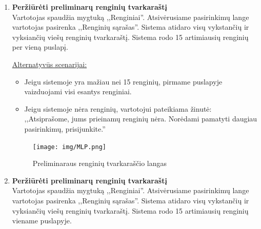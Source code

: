 \documentclass{VUMIFPSkursinis}
\begin{document}
\begin{enumerate} [label = \textbf{U\arabic*.}]
					\underline{Alternatyvūs scenarijai:}
					\begin{itemize}
						\item Jeigu sistemoje yra mažiau nei 15 renginių, pirmame puslapyje vaizduojami visi esantys renginiai. 
						\item Jeigu sistemoje nėra renginių, vartotojui pateikiama žinutė:
						,,Atsiprašome, jums prieinamų renginių nėra. Norėdami pamatyti daugiau pasirinkimų, prisijunkite.''
					\end{itemize}

				\begin{figure}[H]
					\centering
					\texttt{[image: img/MLP.png]}
					\caption{Renginių sąrašo langas}
					\label{fig:uzd_perziureti-vyksianciu-renginiu-sarasa}
				\end{figure}
			\newpage
			\item \textbf{Peržiūrėti preliminarų renginių tvarkaraštį} \\
				Vartotojas spaudžia mygtuką ,,Renginiai''. 
				Atsivėrusiame pasirinkimų lange vartotojas pasirenka ,,Renginių sąrašas''.
				Sistema atidaro visų vykstančių ir vyksiančių viešų renginių tvarkaraštį. 
				Sistema rodo 15 artimiausių renginių per vieną puslapį.
				
				\underline{Alternatyvūs scenarijai:}
				\begin{itemize}
					\item Jeigu sistemoje yra mažiau nei 15 renginių, pirmame puslapyje vaizduojami visi esantys renginiai. 
					\item Jeigu sistemoje nėra renginių, vartotojui pateikiama žinutė:
					,,Atsiprašome, jums prieinamų renginių nėra. Norėdami pamatyti daugiau pasirinkimų, prisijunkite.''
				\end{itemize}

				\begin{figure}[H]
					\centering
					\texttt{[image: img/MLP.png]}
					\caption{Preliminaraus renginių tvarkaraščio langas}
					\label{fig:prelim-tvark-langas}
				\end{figure}
			\item \textbf{Peržiūrėti preliminarų renginių tvarkaraštį} \\
					Vartotojas spaudžia mygtuką ,,Renginiai''. 
					Atsivėrusiame pasirinkimų lange vartotojas pasirenka ,,Renginių sąrašas''.
					Sistema atidaro visų vykstančių ir vyksiančių viešų renginių tvarkaraštį. 
					Sistema rodo 15 artimiausių renginių viename puslapyje.
					

\end{enumerate}
\end{document}
